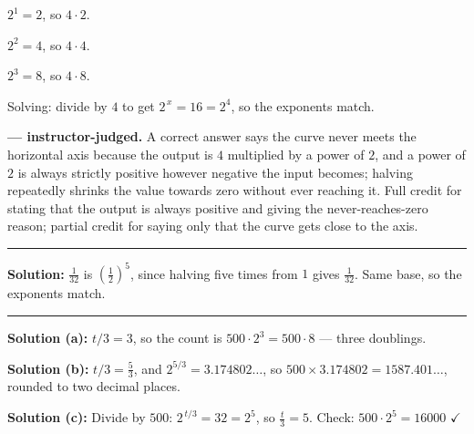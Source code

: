 \documentclass[12pt]{article}
\begin{document}
$2^1 = 2$, so $4 \cdot 2$. 

$2^2 = 4$, so $4 \cdot 4$. 

$2^3 = 8$, so $4 \cdot 8$. 

Solving: divide by $4$ to get $2^{\,x} = 16 = 2^4$, so the exponents match. 

\textbf{--- instructor-judged.} A correct answer says the curve never meets the horizontal axis because the output is $4$ multiplied by a power of $2$, and a power of $2$ is always strictly positive however negative the input becomes; halving repeatedly shrinks the value towards zero without ever reaching it. Full credit for stating that the output is always positive and giving the never-reaches-zero reason; partial credit for saying only that the curve gets close to the axis.

\vspace{0.2cm}\noindent\rule{\linewidth}{0.2pt}


\textbf{Solution:} $\frac{1}{32}$ is $\left(\frac{1}{2}\right)^{5}$, since halving five times from $1$ gives $\frac{1}{32}$. Same base, so the exponents match. 

\vspace{0.2cm}\noindent\rule{\linewidth}{0.2pt}


\textbf{Solution (a):} $t/3 = 3$, so the count is $500 \cdot 2^3 = 500 \cdot 8$ --- three doublings. 

\textbf{Solution (b):} $t/3 = \frac{5}{3}$, and $2^{5/3} = 3.174802\ldots$, so $500 \times 3.174802 = 1587.401\ldots$, rounded to two decimal places. 

\textbf{Solution (c):} Divide by $500$: $2^{\,t/3} = 32 = 2^5$, so $\frac{t}{3} = 5$. Check: $500 \cdot 2^5 = 16000$ $\checkmark$ 
\end{document}
